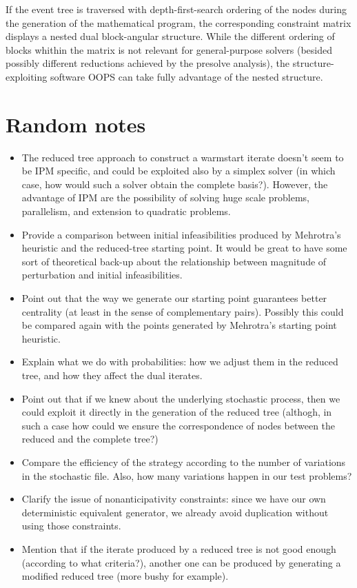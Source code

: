 If the event tree is traversed with depth-first-search ordering of the 
nodes during the generation of the mathematical program, the 
corresponding constraint matrix displays a nested dual block-angular 
structure.
%
While the different ordering of blocks whithin the matrix is not 
relevant for general-purpose solvers (besided possibly different 
reductions achieved by the presolve analysis), the 
structure-exploiting software OOPS \cite{GondzioSarkissian} can take 
fully advantage of the nested structure.


%
%
\section{Random notes}

\begin{itemize}
\item The reduced tree approach to construct a warmstart iterate 
doesn't seem to be IPM specific, and could be exploited also by a 
simplex solver (in which case, how would such a solver obtain the 
complete basis?). However, the advantage of IPM are the possibility 
of solving huge scale problems, parallelism, and extension to 
quadratic problems.

\item Provide a comparison between initial infeasibilities 
produced by Mehrotra's heuristic and the reduced-tree starting 
point. It would be great to have some sort of theoretical back-up 
about the relationship between magnitude of perturbation and 
initial infeasibilities.

\item Point out that the way we generate our starting point 
guarantees better centrality (at least in the sense of 
complementary pairs). Possibly this could be compared again 
with the points generated by Mehrotra's starting point heuristic.

\item Explain what we do with probabilities: how we adjust them 
in the reduced tree, and how they affect the dual iterates.

\item Point out that if we knew about the underlying 
stochastic process, then we could exploit it directly in the 
generation of the reduced tree (althogh, in such a case how 
could we ensure the correspondence of nodes between the reduced 
and the complete tree?)

\item Compare the efficiency of the strategy according to the 
number of variations in the stochastic file. Also, how many 
variations happen in our test problems?

\item Clarify the issue of nonanticipativity constraints: 
since we have our own deterministic equivalent generator, we 
already avoid duplication without using those constraints.

\item Mention that if the iterate produced by a reduced tree 
is not good enough (according to what criteria?), another one 
can be produced by generating a modified reduced tree (more 
bushy for example).
\end{itemize}


